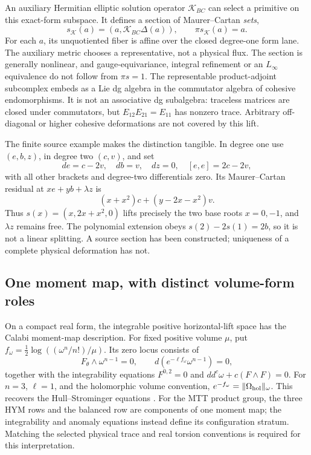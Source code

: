 \documentclass[11pt,a4paper]{article}
\begin{document}
An auxiliary Hermitian elliptic solution operator \(\mathcal K_{BC}\)
can select a primitive on this exact-form subspace. It defines a section
of Maurer--Cartan \emph{sets},
\[
 s_{\mathcal K}(a)=(a,\mathcal K_{BC}\Delta(a)),\qquad
 \pi s_{\mathcal K}(a)=a.
 \tag{S4}\label{eq:string-mc-section}
\]
For each \(a\), its unquotiented fiber is affine over the closed degree-one
form lane. The auxiliary metric chooses a representative, not a physical
flux. The section is generally nonlinear, and gauge-equivariance,
integral refinement or an \(L_\infty\) equivalence do not follow from
\(\pi s=1\). The representable product-adjoint subcomplex embeds as a
Lie dg algebra in the commutator algebra of cohesive endomorphisms. It is
not an associative dg subalgebra: traceless matrices are closed under
commutators, but \(E_{12}E_{21}=E_{11}\) has nonzero trace. Arbitrary
off-diagonal or higher cohesive deformations are not covered by this lift.

The finite source example makes the distinction tangible. In degree one
use \((e,b,z)\), in degree two \((c,v)\), and set
\[
 de=c-2v,\quad db=v,\quad dz=0,\quad [e,e]=2c-2v,
\]
with all other brackets and degree-two differentials zero. Its
Maurer--Cartan residual at \(xe+yb+\lambda z\) is
\[
 (x+x^2)c+(y-2x-x^2)v.
\]
Thus \(s(x)=(x,2x+x^2,0)\) lifts precisely the two base roots \(x=0,-1\),
and \(\lambda z\) remains free. The polynomial extension obeys
\(s(2)-2s(1)=2b\), so it is not a linear splitting. A source section has
been constructed; uniqueness of a complete physical deformation has not.

\subsection{One moment map, with distinct volume-form roles}
\label{sec:string-calabi}

On a compact real form, the integrable positive horizontal-lift space has
the Calabi moment-map description. For fixed positive volume \(\mu\), put
\(f_\omega=\tfrac12\log((\omega^n/n!)/\mu)\). Its zero locus consists of
\[
 F_\theta\wedge\omega^{n-1}=0,\qquad
 d(e^{-\ell f_\omega}\omega^{n-1})=0,
\]
together with the integrability equations \(F^{0,2}=0\) and
\(dd^c\omega+c(F\wedge F)=0\). For \(n=3\), \(\ell=1\), and the
holomorphic volume convention, \(e^{-f_\omega}=\|\Omega_{\rm hol}\|_\omega\).
This recovers the Hull--Strominger equations
\cite[Proposition 5.14 and Corollary 5.15]{GarciaRubioTiplerGauge2020}.
For the MTT product group, the three HYM rows and the balanced row are
components of one moment map; the integrability and anomaly equations
instead define its configuration stratum. Matching the selected physical
trace and real torsion conventions is required for this interpretation.
\end{document}
